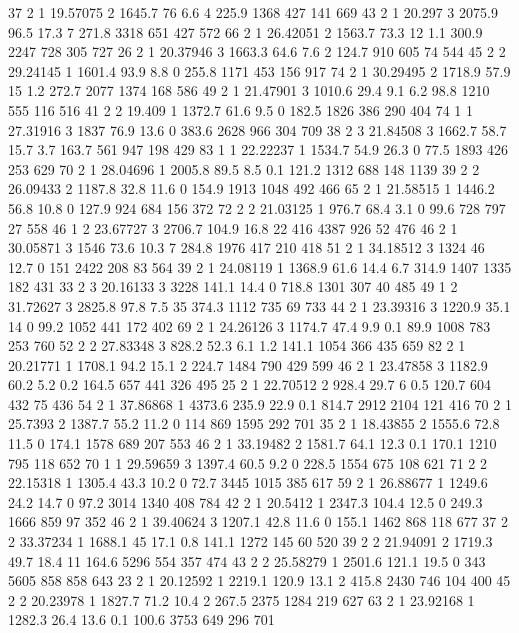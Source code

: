 37	2	1	19.57075	2	1645.7	76		6.6		4		225.9	1368	427		141		669
43	2	1	20.297	    3	2075.9	96.5	17.3	7		271.8	3318	651		427		572
66	2	1	26.42051	2	1563.7	73.3	12		1.1		300.9	2247	728		305		727
26	2	1	20.37946	3	1663.3	64.6	7.6		2		124.7	910		605		74		544
45	2	2	29.24145	1	1601.4	93.9	8.8		0		255.8	1171	453		156		917
74	2	1	30.29495	2	1718.9	57.9	15		1.2		272.7	2077	1374	168		586
49	2	1	21.47901	3	1010.6	29.4	9.1		6.2		98.8	1210	555		116		516
41	2	2	19.409	    1	1372.7	61.6	9.5		0		182.5	1826	386		290		404
74	1	1	27.31916	3	1837	76.9	13.6	0		383.6	2628	966		304		709
38	2	3	21.84508	3	1662.7	58.7	15.7	3.7		163.7	561		947		198		429
83	1	1	22.22237	1	1534.7	54.9	26.3	0		77.5	1893	426		253		629
70	2	1	28.04696	1	2005.8	89.5	8.5		0.1		121.2	1312	688		148		1139
39	2	2	26.09433	2	1187.8	32.8	11.6	0		154.9	1913	1048	492		466
65	2	1	21.58515	1	1446.2	56.8	10.8	0		127.9	924		684		156		372
72	2	2	21.03125	1	976.7	68.4	3.1	0	99.6	728		797		27		558
46	1	2	23.67727	3	2706.7	104.9	16.8	22		416		4387	926		52		476
46	2	1	30.05871	3	1546	73.6	10.3	7		284.8	1976	417		210		418
51	2	1	34.18512	3	1324	46		12.7	0		151		2422	208		83		564
39	2	1	24.08119	1	1368.9	61.6	14.4	6.7		314.9	1407	1335	182		431
33	2	3	20.16133	3	3228	141.1	14.4	0		718.8	1301	307		40		485
49	1	2	31.72627	3	2825.8	97.8	7.5		35		374.3	1112	735		69		733
44	2	1	23.39316	3	1220.9	35.1	14		0		99.2	1052	441		172		402
69	2	1	24.26126	3	1174.7	47.4	9.9		0.1		89.9	1008	783		253		760
52	2	2	27.83348	3	828.2	52.3	6.1		1.2		141.1	1054	366		435		659
82	2	1	20.21771	1	1708.1	94.2	15.1	2		224.7	1484	790		429		599
46	2	1	23.47858	3	1182.9	60.2	5.2		0.2		164.5	657		441		326		495
25	2	1	22.70512	2	928.4	29.7	6		0.5		120.7	604		432		75		436
54	2	1	37.86868	1	4373.6	235.9	22.9	0.1		814.7	2912	2104	121		416
70	2	1	25.7393	    2	1387.7	55.2	11.2	0		114		869		1595	292		701
35	2	1	18.43855	2	1555.6	72.8	11.5	0		174.1	1578	689		207		553
46	2	1	33.19482	2	1581.7	64.1	12.3	0.1		170.1	1210	795		118		652
70	1	1	29.59659	3	1397.4	60.5	9.2		0		228.5	1554	675		108		621
71	2	2	22.15318	1	1305.4	43.3	10.2	0		72.7	3445	1015	385		617
59	2	1	26.88677	1	1249.6	24.2	14.7	0		97.2	3014	1340	408		784
42	2	1	20.5412	    1	2347.3	104.4	12.5	0		249.3	1666	859		97		352
46	2	1	39.40624	3	1207.1	42.8	11.6	0		155.1	1462	868		118		677
37	2	2	33.37234	1	1688.1	45		17.1	0.8		141.1	1272	145		60		520
39	2	2	21.94091	2	1719.3	49.7	18.4	11		164.6	5296	554		357		474
43	2	2	25.58279	1	2501.6	121.1	19.5	0		343		5605	858		858		643
23	2	1	20.12592	1	2219.1	120.9	13.1	2		415.8	2430	746		104		400
45	2	2	20.23978	1	1827.7	71.2	10.4	2		267.5	2375	1284	219		627
63	2	1	23.92168	1	1282.3	26.4	13.6	0.1		100.6	3753	649		296		701
